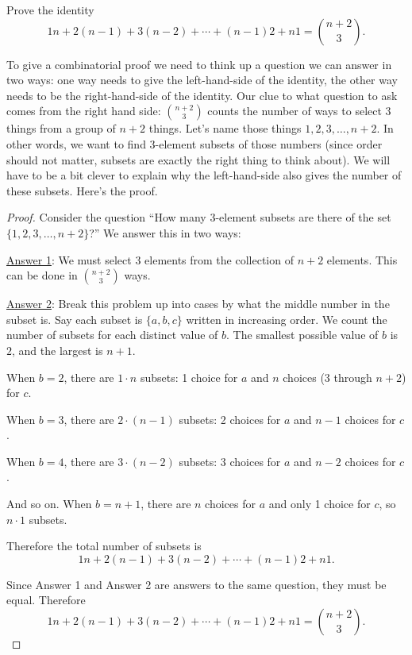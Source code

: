 \documentclass[12pt]{article}
\begin{document}
\begin{example}
  Prove the identity
  \[1 n + 2(n-1) + 3  (n-2) + \cdots + (n-1) 2 + n  1 = {n+2 \choose 3}.\]
  \begin{solution}
    To give a combinatorial proof we need to think up a question we can answer in two ways: one way needs to give the left-hand-side of the identity, the other way needs to be the right-hand-side of the identity.  Our clue to what question to ask comes from the right hand side: ${n+2 \choose 3}$ counts the number of ways to select 3 things from a group of $n+2$ things.  Let's name those things $1, 2, 3, \ldots, n+2$.  In other words, we want to find 3-element subsets of those numbers (since order should not matter, subsets are exactly the right thing to think about).  We will have to be a bit clever to explain why the left-hand-side also gives the number of these subsets.  Here's the proof.

    \begin{proof}
      Consider the question ``How many 3-element subsets are there of the set $\{1,2,3,\ldots, n+2\}$?''  We answer this in two ways:

      \underline{Answer 1}: We must select 3 elements from the collection of $n+2$ elements.  This can be done in ${n+2 \choose 3}$ ways.

      \underline{Answer 2}: Break this problem up into cases by what the middle number in the subset is.  Say each subset is $\{a,b,c\}$ written in increasing order.  We count the number of subsets for each distinct value of $b$.  The smallest possible value of $b$ is $2$, and the largest is $n+1$.

      When $b = 2$, there are $1 \cdot n$ subsets: 1 choice for $a$ and $n$ choices (3 through $n+2$) for $c$.

      When $b = 3$, there are $2 \cdot (n-1)$ subsets: 2 choices for $a$ and $n-1$ choices for $c$.

      When $b = 4$, there are $3 \cdot (n-2)$ subsets: 3 choices for $a$ and $n-2$ choices for $c$.

      And so on.  When $b = n+1$, there are $n$ choices for $a$ and only 1 choice for $c$, so $n \cdot 1$ subsets.

      Therefore the total number of subsets is \[1 n + 2 (n-1) + 3  (n-2) + \cdots + (n-1)2 + n  1.\]

      Since Answer 1 and Answer 2 are answers to the same question, they must be equal.  Therefore
      \[1 n + 2 (n-1) + 3  (n-2) + \cdots + (n-1) 2 + n  1 = {n+2 \choose 3}.\]

    \end{proof}

  \end{solution}

\end{example}
\end{document}
